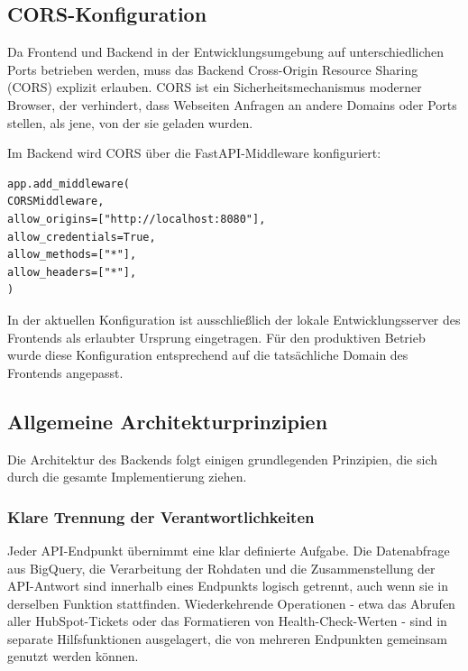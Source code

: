 \subsection{CORS-Konfiguration}
Da Frontend und Backend in der Entwicklungsumgebung auf unterschiedlichen Ports betrieben werden, muss das Backend Cross-Origin Resource Sharing (CORS) explizit erlauben. CORS ist ein Sicherheitsmechanismus moderner Browser, der verhindert, dass Webseiten Anfragen an andere Domains oder Ports stellen, als jene, von der sie geladen wurden.

Im Backend wird CORS über die FastAPI-Middleware konfiguriert:

\begin{verbatim}
app.add_middleware(
CORSMiddleware,
allow_origins=["http://localhost:8080"],
allow_credentials=True,
allow_methods=["*"],
allow_headers=["*"],
)
\end{verbatim}

In der aktuellen Konfiguration ist ausschließlich der lokale Entwicklungsserver des Frontends als erlaubter Ursprung eingetragen. Für den produktiven Betrieb wurde diese Konfiguration entsprechend auf die tatsächliche Domain des Frontends angepasst.

\subsection{Allgemeine Architekturprinzipien}
Die Architektur des Backends folgt einigen grundlegenden Prinzipien, die sich durch die gesamte Implementierung ziehen.

\subsubsection{Klare Trennung der Verantwortlichkeiten}
Jeder API-Endpunkt übernimmt eine klar definierte Aufgabe. Die Datenabfrage aus BigQuery, die Verarbeitung der Rohdaten und die Zusammenstellung der API-Antwort sind innerhalb eines Endpunkts logisch getrennt, auch wenn sie in derselben Funktion stattfinden. Wiederkehrende Operationen - etwa das Abrufen aller HubSpot-Tickets oder das Formatieren von Health-Check-Werten - sind in separate Hilfsfunktionen ausgelagert, die von mehreren Endpunkten gemeinsam genutzt werden können.

